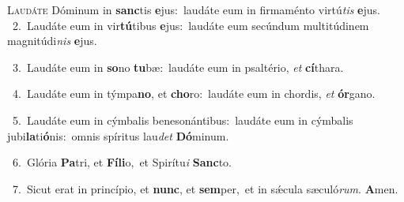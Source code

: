 \lettrine{\initial\textcolor{\initialcolor}{L}}{audáte} Dóminum in \textbf{sanc}\-tis \textbf{e}\-jus:~\star laudáte eum in firmaménto virtú\textit{tis} \textbf{e}\-jus.\\
{\numbfont\textcolor{\numbcolor}{~2.}}~Laudáte eum in vir\-\textbf{tú}\-tibus \textbf{e}\-jus:~\star laudáte eum secúndum multitúdinem magnitúdi\textit{nis} \textbf{e}\-jus.\par
{\numbfont\textcolor{\numbcolor}{~3.}}~Laudáte eum in \textbf{so}\-no \textbf{tu}\-bæ:~\star laudáte eum in psaltério, \textit{et} \textbf{cí}\-thara.\par
{\numbfont\textcolor{\numbcolor}{~4.}}~Laudáte eum in týmpa\-\textbf{no}\-, et \textbf{cho}\-ro:~\star laudáte eum in chordis, \textit{et} \textbf{ór}\-gano.\par
{\numbfont\textcolor{\numbcolor}{~5.}}~Laudáte eum in cýmbalis benesonántibus:~\dagger laudáte eum in cýmbalis jubi\-\textbf{la}\-ti\-\textbf{ó}\-nis:~\star omnis spíritus lau\textit{det} \textbf{Dó}\-minum.\par
{\numbfont\textcolor{\numbcolor}{~6.}}~Glória \textbf{Pa}\-tri, et \textbf{Fí}\-\textbf{li}o,~\star et Spirítu\textit{i} \textbf{Sanc}\-to.\par
{\numbfont\textcolor{\numbcolor}{~7.}}~Sicut erat in princípio, et \textbf{nunc}\-, et \textbf{sem}\-per,~\star et in sǽcula sæculó\-\textit{rum}\-. \textbf{A}\-men.\par
